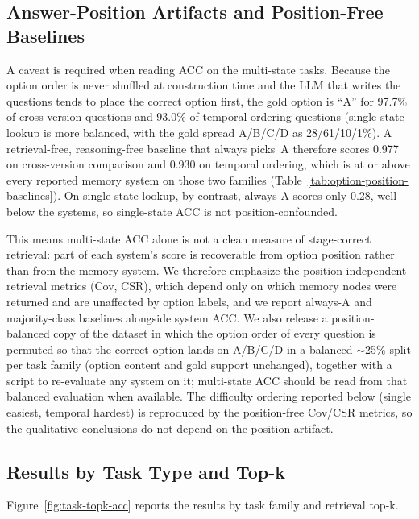 \subsection{Answer-Position Artifacts and Position-Free Baselines}
\label{sec:position-bias}

A caveat is required when reading ACC on the multi-state tasks. Because the option order is never shuffled at construction time and the LLM that writes the questions tends to place the correct option first, the gold option is ``A'' for 97.7\% of cross-version questions and 93.0\% of temporal-ordering questions (single-state lookup is more balanced, with the gold spread A/B/C/D as 28/61/10/1\%). A retrieval-free, reasoning-free baseline that always picks~A therefore scores 0.977 on cross-version comparison and 0.930 on temporal ordering, which is at or above every reported memory system on those two families (Table~\ref{tab:option-position-baselines}). On single-state lookup, by contrast, always-A scores only 0.28, well below the systems, so single-state ACC is not position-confounded.

This means multi-state ACC alone is not a clean measure of stage-correct retrieval: part of each system's score is recoverable from option position rather than from the memory system. We therefore emphasize the position-independent retrieval metrics (Cov, CSR), which depend only on which memory nodes were returned and are unaffected by option labels, and we report always-A and majority-class baselines alongside system ACC. We also release a position-balanced copy of the dataset in which the option order of every question is permuted so that the correct option lands on A/B/C/D in a balanced $\sim$25\% split per task family (option content and gold support unchanged), together with a script to re-evaluate any system on it; multi-state ACC should be read from that balanced evaluation when available. The difficulty ordering reported below (single easiest, temporal hardest) is reproduced by the position-free Cov/CSR metrics, so the qualitative conclusions do not depend on the position artifact.



\subsection{Results by Task Type and Top-k}

Figure~\ref{fig:task-topk-acc} reports the results by task family and retrieval top-k.

